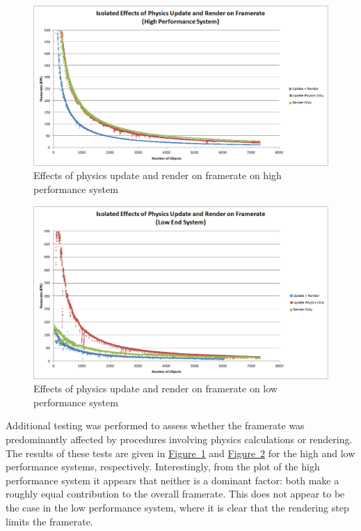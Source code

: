 \documentclass[12pt, titlepage]{article}
\begin{document}
\begin{figure}[h]
\centering
\includegraphics[width=\textwidth]{isolatedhigh}
\caption{Effects of physics update and render on framerate on high performance system} \label{fig:isohi}
\end{figure}


\begin{figure}[h]
\centering
\includegraphics[width=\textwidth]{isolatedlo}
\caption{Effects of physics update and render on framerate on low performance system} \label{fig:isolo}
\end{figure}

Additional testing was performed to assess whether the framerate was predominantly affected by procedures involving physics calculations or rendering.  The results of these tests are given in \hyperref[fig:isohi]{Figure~\ref*{fig:isohi}} and \hyperref[fig:isolo]{Figure~\ref*{fig:isolo}} for the high and low performance systems, respectively.  Interestingly, from the plot of the high performance system it appears that neither is a dominant factor:  both make a roughly equal contribution to the overall framerate.  This does not appear to be the case in the low performance system, where it is clear that the rendering step limits the framerate.
\end{document}
